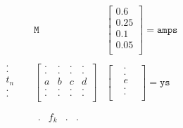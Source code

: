 
%

\[ 
\begin{matrix}
& {\mathtt{M}} &
 \begin{bmatrix} 
0.6 \\
0.25 \\
0.1 \\
0.05 \\
\end{bmatrix}
= \mathtt{amps}
\\
\\
\begin{matrix} 
&.& \\
&.& \\
&t_n& \\
&.& \\
&.& \\
\end{matrix}
&
\begin{bmatrix} 
. & . & . & . \\
. & . & . & . \\
a & b & c & d \\
. & . & . & . \\
. & . & . & . \\
\end{bmatrix} 
&
\begin{bmatrix} 
&.& \\
&.& \\
&e& \\
&.& \\
&.& \\
\end{bmatrix} = \mathtt{ys}
\\
\\
&
\begin{matrix}
. & f_k & . & . \\
\end{matrix}
&
\\
\end{matrix}
\]


 
